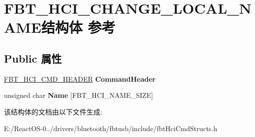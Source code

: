 \hypertarget{struct_f_b_t___h_c_i___c_h_a_n_g_e___l_o_c_a_l___n_a_m_e}{}\section{F\+B\+T\+\_\+\+H\+C\+I\+\_\+\+C\+H\+A\+N\+G\+E\+\_\+\+L\+O\+C\+A\+L\+\_\+\+N\+A\+M\+E结构体 参考}
\label{struct_f_b_t___h_c_i___c_h_a_n_g_e___l_o_c_a_l___n_a_m_e}
\subsection*{Public 属性}
\begin{DoxyCompactItemize}
\item 
\mbox{\label{struct_f_b_t___h_c_i___c_h_a_n_g_e___l_o_c_a_l___n_a_m_e_af420df3f17cdd44bd8572c6e983ca52a}} 
\hyperlink{struct_f_b_t___h_c_i___c_m_d___h_e_a_d_e_r}{F\+B\+T\+\_\+\+H\+C\+I\+\_\+\+C\+M\+D\+\_\+\+H\+E\+A\+D\+ER} {\bfseries Command\+Header}
\item 
\mbox{\label{struct_f_b_t___h_c_i___c_h_a_n_g_e___l_o_c_a_l___n_a_m_e_a643fd7a938b1fa3eb89c387a98ba3b02}} 
unsigned char {\bfseries Name} \mbox{[}F\+B\+T\+\_\+\+H\+C\+I\+\_\+\+N\+A\+M\+E\+\_\+\+S\+I\+ZE\mbox{]}
\end{DoxyCompactItemize}


该结构体的文档由以下文件生成\+:\begin{DoxyCompactItemize}
\item 
E\+:/\+React\+O\+S-\/0../drivers/bluetooth/fbtusb/include/fbt\+Hci\+Cmd\+Structs.\+h\end{DoxyCompactItemize}
